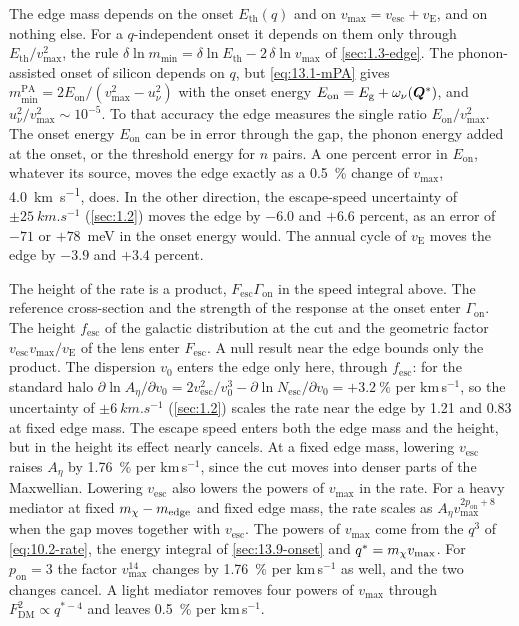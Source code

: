 The edge mass depends on the onset $E_{\mathrm{th}}(q)$ and on $v_{\mathrm{max}} = v_{\mathrm{esc}} + v_{\mathrm{E}}$, and on nothing else. For a $q$-independent onset it depends on them only through $E_{\mathrm{th}}/v_{\mathrm{max}}^2$, the rule $\delta\ln m_{\mathrm{min}} = \delta\ln E_{\mathrm{th}} - 2\,\delta\ln v_{\mathrm{max}}$ of \cref{sec:1.3-edge}. The phonon-assisted onset of silicon depends on $q$, but \cref{eq:13.1-mPA} gives $m_{\mathrm{min}}^{\mathrm{PA}} = 2E_{\mathrm{on}}/(v_{\mathrm{max}}^2 - u_\nu^2)$ with the onset energy $E_{\mathrm{on}} = E_{\mathrm{g}} + \omega_\nu(\bm{Q}^*)$, and $u_\nu^2/v_{\mathrm{max}}^2 \sim 10^{-5}$. To that accuracy the edge measures the single ratio $E_{\mathrm{on}}/v_{\mathrm{max}}^2$. The onset energy $E_{\mathrm{on}}$ can be in error through the gap, the phonon energy added at the onset, or the threshold energy for $n$ pairs. A one percent error in $E_{\mathrm{on}}$, whatever its source, moves the edge exactly as a \SI{0.5}{\percent} change of $v_{\mathrm{max}}$, \SI{4.0}{km.s^{-1}}, does. In the other direction, the escape-speed uncertainty of $\pm\SI{25}{km.s^{-1}}$ (\cref{sec:1.2}) moves the edge by $-6.0$ and $+6.6$ percent, as an error of $-71$ or $+78$~meV in the onset energy would. The annual cycle of $v_{\mathrm{E}}$ moves the edge by $-3.9$ and $+3.4$ percent.

The height of the rate is a product, $F_{\mathrm{esc}}\varGamma_{\mathrm{on}}$ in the speed integral above. The reference cross-section and the strength of the response at the onset enter $\varGamma_{\mathrm{on}}$. The height $f_{\mathrm{esc}}$ of the galactic distribution at the cut and the geometric factor $v_{\mathrm{esc}}v_{\mathrm{max}}/v_{\mathrm{E}}$ of the lens enter $F_{\mathrm{esc}}$. A null result near the edge bounds only the product. The dispersion $v_0$ enters the edge only here, through $f_{\mathrm{esc}}$: for the standard halo $\partial\ln A_\eta/\partial v_0 = 2v_{\mathrm{esc}}^2/v_0^3 - \partial\ln N_{\mathrm{esc}}/\partial v_0 = +\SI{3.2}{\percent}$ per km\,s$^{-1}$, so the uncertainty of $\pm\SI{6}{km.s^{-1}}$ (\cref{sec:1.2}) scales the rate near the edge by 1.21 and 0.83 at fixed edge mass. The escape speed enters both the edge mass and the height, but in the height its effect nearly cancels. At a fixed edge mass, lowering $v_{\mathrm{esc}}$ raises $A_\eta$ by \SI{1.76}{\percent} per km\,s$^{-1}$, since the cut moves into denser parts of the Maxwellian. Lowering $v_{\mathrm{esc}}$ also lowers the powers of $v_{\mathrm{max}}$ in the rate. For a heavy mediator at fixed $m_{\chi} - m_{\mathrm{edge}}$ and fixed edge mass, the rate scales as $A_\eta v_{\mathrm{max}}^{2p_{\mathrm{on}}+8}$ when the gap moves together with $v_{\mathrm{esc}}$. The powers of $v_{\mathrm{max}}$ come from the $q^3$ of \cref{eq:10.2-rate}, the energy integral of \cref{sec:13.9-onset} and $q^* = m_{\chi} v_{\mathrm{max}}$. For $p_{\mathrm{on}} = 3$ the factor $v_{\mathrm{max}}^{14}$ changes by \SI{1.76}{\percent} per km\,s$^{-1}$ as well, and the two changes cancel. A light mediator removes four powers of $v_{\mathrm{max}}$ through $F_{\mathrm{DM}}^2 \propto q^{*-4}$ and leaves \SI{0.5}{\percent} per km\,s$^{-1}$.

